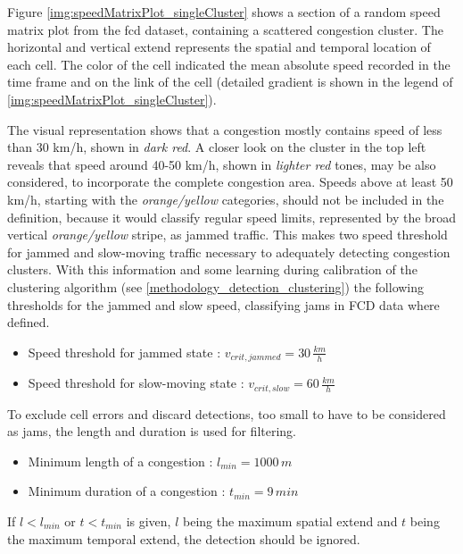 
Figure \ref{img:speedMatrixPlot_singleCluster} shows a section of a random speed matrix plot from the \acrshort{fcd} dataset, containing a scattered congestion cluster. The horizontal and vertical extend represents the spatial and temporal location of each cell. The color of the cell indicated the mean absolute speed recorded in the time frame and on the link of the cell (detailed gradient is shown in the legend of \cref{img:speedMatrixPlot_singleCluster}).

The visual representation shows that a congestion mostly contains speed of less than 30 km/h, shown in \textit{dark red}. A closer look on the cluster in the top left reveals that speed around 40-50 km/h, shown in \textit{lighter red} tones, may be also considered, to incorporate the complete congestion area. Speeds above at least 50 km/h, starting with the \textit{orange/yellow} categories, should not be included in the definition, because it would classify regular speed limits, represented by the broad vertical \textit{orange/yellow} stripe, as jammed traffic. This makes two speed threshold for jammed and slow-moving traffic necessary to adequately detecting congestion clusters. With this information and some learning during calibration of the clustering algorithm (see \cref{methodology_detection_clustering}) the following thresholds for the jammed and slow speed, classifying \glspl{jam} in FCD data where defined.

\begin{itemize}
	\item Speed threshold for jammed state : $v_{crit,jammed} = 30\,\frac{km}{h}$
	\item Speed threshold for slow-moving state : $v_{crit,slow} = 60\,\frac{km}{h}$
\end{itemize}

To exclude cell errors and discard detections, too small to have to be considered as jams, the length and duration is used for filtering. 

\begin{itemize}
	\item Minimum length of a congestion : $l_{min} = 1000\,m$
	\item Minimum duration of a congestion : $t_{min} = 9\,min$
\end{itemize}

If $l < l_{min}$ or $t < t_{min}$ is given, $l$ being the maximum spatial extend and $t$ being the maximum temporal extend, the detection should be ignored.
